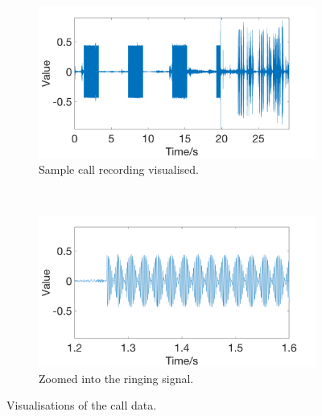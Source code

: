 \documentclass[main.tex]{subfiles}
\begin{document}
\begin{figure}[p]
	\captionsetup[subfigure]{position=b}
        \centering
        \begin{subfigure}{\textwidth}
                \includegraphics[width=\textwidth]{pics/wave1}
                \caption{Sample call recording visualised.}
                \label{fig:wave1}
        \end{subfigure}
        \\
        \begin{subfigure}{\textwidth}
                \includegraphics[width=\textwidth]{pics/wave2}
                \caption{Zoomed into the ringing signal.}
                \label{fig:wave2}
        \end{subfigure}
	\caption{Visualisations of the call data.}
	\label{fig:wave}
\end{figure}
\end{document}
